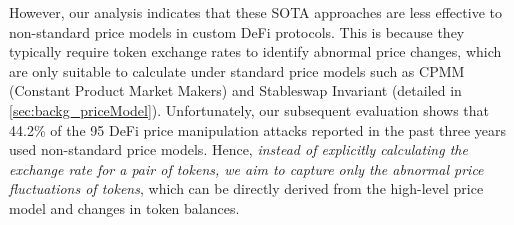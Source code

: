 
However, our analysis indicates that these SOTA approaches are less effective to non-standard price models in custom DeFi protocols.
This is because they typically require token exchange rates to identify abnormal price changes, which are only suitable to calculate under standard price models such as CPMM (Constant Product Market Makers) and Stableswap Invariant (detailed in \mysec\ref{sec:backg_priceModel}).
Unfortunately, our subsequent evaluation shows that 44.2\% of the 95 DeFi price manipulation attacks reported in the past three years used non-standard price models.
Hence, \textit{instead of explicitly calculating the exchange rate for a pair of tokens, we aim to capture only the abnormal price fluctuations of tokens}, which can be directly derived from the high-level price model and changes in token balances.


